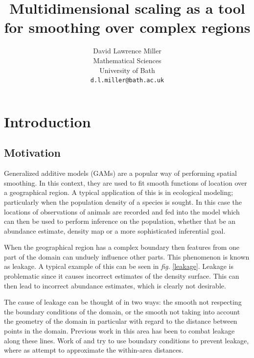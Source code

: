 \documentclass[a4paper,10pt]{article}
\title{Multidimensional scaling as a tool for smoothing over complex regions}
\author{David Lawrence Miller\\Mathematical Sciences\\University of Bath\\\texttt{d.l.miller@bath.ac.uk}}
\newcommand{\fig}[1]{\emph{fig.} \ref{#1}}
\begin{document}
 
 
 
\newtheorem{thm}{Theorem}[section]
 
\newtheorem{defn}{Definition}[section]
 
\maketitle


\section{Introduction}

\subsection{Motivation}

Generalized additive models (GAMs) are a popular way of performing spatial smoothing. In this context, they are used to fit smooth functions of location over a geographical region. A typical application of this is in ecological modeling; particularly when the population density of a species is sought. In this case the locations of observations of animals are recorded and fed into the model which can then be used to perform inference on the population, whether that be an abundance estimate, density map or a more sophisticated inferential goal.

When the geographical region has a complex boundary then features from one part of the domain can unduely influence other parts. This phenomenon is known as leakage. A typical example of this can be seen in \fig{leakage}. Leakage is problematic since it causes incorrect estimates of the density surface. This can then lead to incorrect abundance estimates, which is clearly not desirable.

The cause of leakage can be thought of in two ways: the smooth not respecting the boundary conditions of the domain, or the smooth not taking into account the geometry of the domain in particular with regard to the distance between points in the domain. Previous work in this area has been to combat leakage along these lines. Work of \cite{ramsay} and \cite{soap} try to use boundary conditions to prevent leakage, where as \cite{wangranalli} attempt to approximate the within-area distances.
\end{document}
